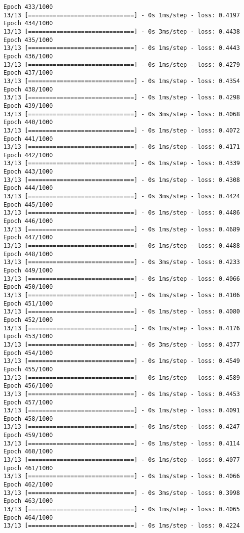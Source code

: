\documentclass[11pt]{article}
\begin{document}
\begin{Verbatim}[commandchars=\\\{\}]
Epoch 433/1000
13/13 [==============================] - 0s 1ms/step - loss: 0.4197
Epoch 434/1000
13/13 [==============================] - 0s 3ms/step - loss: 0.4438
Epoch 435/1000
13/13 [==============================] - 0s 1ms/step - loss: 0.4443
Epoch 436/1000
13/13 [==============================] - 0s 1ms/step - loss: 0.4279
Epoch 437/1000
13/13 [==============================] - 0s 1ms/step - loss: 0.4354
Epoch 438/1000
13/13 [==============================] - 0s 1ms/step - loss: 0.4298
Epoch 439/1000
13/13 [==============================] - 0s 3ms/step - loss: 0.4068
Epoch 440/1000
13/13 [==============================] - 0s 1ms/step - loss: 0.4072
Epoch 441/1000
13/13 [==============================] - 0s 1ms/step - loss: 0.4171
Epoch 442/1000
13/13 [==============================] - 0s 1ms/step - loss: 0.4339
Epoch 443/1000
13/13 [==============================] - 0s 1ms/step - loss: 0.4308
Epoch 444/1000
13/13 [==============================] - 0s 3ms/step - loss: 0.4424
Epoch 445/1000
13/13 [==============================] - 0s 1ms/step - loss: 0.4486
Epoch 446/1000
13/13 [==============================] - 0s 1ms/step - loss: 0.4689
Epoch 447/1000
13/13 [==============================] - 0s 1ms/step - loss: 0.4488
Epoch 448/1000
13/13 [==============================] - 0s 3ms/step - loss: 0.4233
Epoch 449/1000
13/13 [==============================] - 0s 1ms/step - loss: 0.4066
Epoch 450/1000
13/13 [==============================] - 0s 1ms/step - loss: 0.4106
Epoch 451/1000
13/13 [==============================] - 0s 1ms/step - loss: 0.4080
Epoch 452/1000
13/13 [==============================] - 0s 1ms/step - loss: 0.4176
Epoch 453/1000
13/13 [==============================] - 0s 3ms/step - loss: 0.4377
Epoch 454/1000
13/13 [==============================] - 0s 1ms/step - loss: 0.4549
Epoch 455/1000
13/13 [==============================] - 0s 1ms/step - loss: 0.4589
Epoch 456/1000
13/13 [==============================] - 0s 1ms/step - loss: 0.4453
Epoch 457/1000
13/13 [==============================] - 0s 1ms/step - loss: 0.4091
Epoch 458/1000
13/13 [==============================] - 0s 1ms/step - loss: 0.4247
Epoch 459/1000
13/13 [==============================] - 0s 1ms/step - loss: 0.4114
Epoch 460/1000
13/13 [==============================] - 0s 1ms/step - loss: 0.4077
Epoch 461/1000
13/13 [==============================] - 0s 1ms/step - loss: 0.4066
Epoch 462/1000
13/13 [==============================] - 0s 3ms/step - loss: 0.3998
Epoch 463/1000
13/13 [==============================] - 0s 1ms/step - loss: 0.4065
Epoch 464/1000
13/13 [==============================] - 0s 1ms/step - loss: 0.4224

\end{Verbatim}
\end{document}
